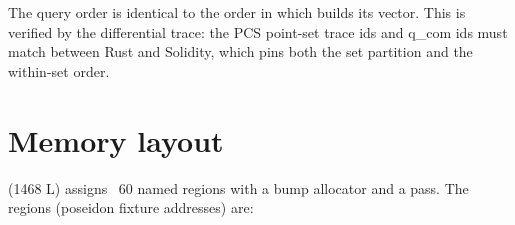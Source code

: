 \begin{claim}
The  query order is identical to the order in which
 builds its  vector.
This is verified by the differential trace: the PCS point-set trace ids
 and q\_com ids  must match between Rust
and Solidity, which pins both the set partition and the within-set order.
\end{claim}

\section{Memory layout}
\label{sec:memlayout}

 (1468 L) assigns ~60 named
regions with a bump allocator and a  pass. The
regions (poseidon fixture addresses) are:

